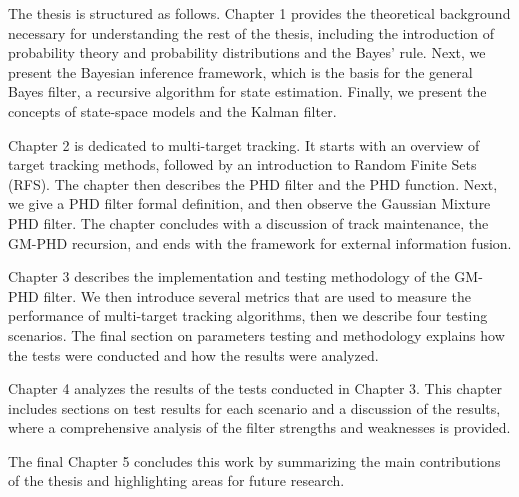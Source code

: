 The thesis is structured as follows. Chapter 1 provides the theoretical background necessary for understanding the rest of the thesis, including the introduction of probability theory and probability distributions and the Bayes' rule. Next, we present the Bayesian inference framework, which is the basis for the general Bayes filter, a recursive algorithm for state estimation. Finally, we present the concepts of state-space models and the Kalman filter.

Chapter 2 is dedicated to multi-target tracking. It starts with an overview of target tracking methods, followed by an introduction to Random Finite Sets (RFS). The chapter then describes the PHD filter and the PHD function. Next, we give a PHD filter formal definition, and then observe the Gaussian Mixture PHD filter. The chapter concludes with a discussion of track maintenance, the GM-PHD recursion, and ends with the framework for external information fusion.

Chapter 3 describes the implementation and testing methodology of the GM-PHD filter. We then introduce several metrics that are used to measure the performance of multi-target tracking algorithms, then we describe four testing scenarios. The final section on parameters testing and methodology explains how the tests were conducted and how the results were analyzed.

Chapter 4 analyzes the results of the tests conducted in Chapter 3. This chapter includes sections on test results for each scenario and a discussion of the results, where a comprehensive analysis of the filter strengths and weaknesses is provided.

The final Chapter 5 concludes this work by summarizing the main contributions of the thesis and highlighting areas for future research.
